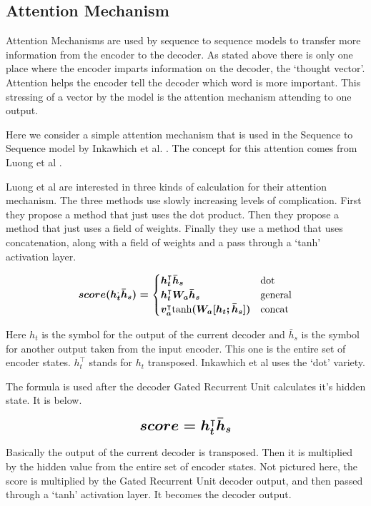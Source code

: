 \subsection{Attention Mechanism}

Attention Mechanisms are used by sequence to sequence models to transfer more information from the encoder to the decoder. As stated above there is only one place where the encoder imparts information on the decoder, the `thought vector'. Attention helps the encoder tell the decoder which word is more important. This stressing of a vector by the model is the attention mechanism attending to one output.

Here we consider a simple attention mechanism that is used in the Sequence to Sequence model by Inkawhich et al. \cite{2018Inkawhich}. The concept for this attention comes from Luong et al \cite{DBLP:journals/corr/LuongPM15}.

Luong et al \cite{DBLP:journals/corr/LuongPM15} are interested in three kinds of calculation for their attention mechanism. The three methods use slowly increasing levels of complication. First they propose a method that just uses the dot product. Then they propose a method that just uses a field of weights. Finally they use a method that uses concatenation, along with a field of weights and a pass through a `tanh' activation layer.

$$
\boldmath
score(h_t^ \text{,} \bar{h}_s) =
\begin{cases}
    h_t^\intercal \bar{h}_s & \text{dot} \\
	h_t^\intercal W_a \bar{h}_s & \text{general} \\
	v_a^\intercal \text{tanh}(W_a [h_t ; \bar{h}_s] ) & \text{concat}
\end{cases}
\unboldmath
$$

Here $h_t$ is the symbol for the output of the current decoder and $\bar{h}_s $ is the symbol for another output taken from the input encoder. This one is the entire set of encoder states. $h_t^\intercal$ stands for $h_t$ transposed. Inkawhich et al \cite{2018Inkawhich} uses the `dot' variety.

The formula is used after the decoder Gated Recurrent Unit calculates it's hidden state. It is below.

$$ 
\boldmath
\mathlarger{ \mathlarger{
score = h_t^\intercal \bar{h}_s 
} }
\unboldmath
$$ 

Basically the output of the current decoder is transposed. Then it is multiplied by the hidden value from the entire set of encoder states. Not pictured here, the score is multiplied by the Gated Recurrent Unit decoder output, and then passed through a `tanh' activation layer. It becomes the decoder output.

